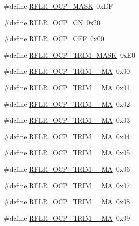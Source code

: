 \begin{DoxyCompactItemize}
\item 
\#define \mbox{\hyperlink{sx1276_regs-_lo_ra_8h_a811d1ea4838fb5bdbc731e246f9abd00}{R\+F\+L\+R\+\_\+\+O\+C\+P\+\_\+\+M\+A\+SK}}~0x\+DF
\item 
\#define \mbox{\hyperlink{sx1276_regs-_lo_ra_8h_ab4cd8bafefd94bf96c0eda92a1a0e2cc}{R\+F\+L\+R\+\_\+\+O\+C\+P\+\_\+\+ON}}~0x20
\item 
\#define \mbox{\hyperlink{sx1276_regs-_lo_ra_8h_add262ca41df12a73f7ab0fe05ca26253}{R\+F\+L\+R\+\_\+\+O\+C\+P\+\_\+\+O\+FF}}~0x00
\item 
\#define \mbox{\hyperlink{sx1276_regs-_lo_ra_8h_a218c5b62787ba2141067b6273f2e43a3}{R\+F\+L\+R\+\_\+\+O\+C\+P\+\_\+\+T\+R\+I\+M\+\_\+\+M\+A\+SK}}~0x\+E0
\item 
\#define \mbox{\hyperlink{sx1276_regs-_lo_ra_8h_a6656289f06f654d070ee51d72830d1cb}{R\+F\+L\+R\+\_\+\+O\+C\+P\+\_\+\+T\+R\+I\+M\+\_\+\_\+\+MA}}~0x00
\item 
\#define \mbox{\hyperlink{sx1276_regs-_lo_ra_8h_a102d3235b329da485a39882b6f06fec4}{R\+F\+L\+R\+\_\+\+O\+C\+P\+\_\+\+T\+R\+I\+M\+\_\+\_\+\+MA}}~0x01
\item 
\#define \mbox{\hyperlink{sx1276_regs-_lo_ra_8h_a916a524ad394506a119ea2c5d8d2642c}{R\+F\+L\+R\+\_\+\+O\+C\+P\+\_\+\+T\+R\+I\+M\+\_\+\_\+\+MA}}~0x02
\item 
\#define \mbox{\hyperlink{sx1276_regs-_lo_ra_8h_a7fc3cb1a990f3c479cf620772593991b}{R\+F\+L\+R\+\_\+\+O\+C\+P\+\_\+\+T\+R\+I\+M\+\_\+\_\+\+MA}}~0x03
\item 
\#define \mbox{\hyperlink{sx1276_regs-_lo_ra_8h_a1d7e9642b9adfb481f9696186a068db8}{R\+F\+L\+R\+\_\+\+O\+C\+P\+\_\+\+T\+R\+I\+M\+\_\+\_\+\+MA}}~0x04
\item 
\#define \mbox{\hyperlink{sx1276_regs-_lo_ra_8h_a08ffd9de8d0ea7320df82bf3ddd38430}{R\+F\+L\+R\+\_\+\+O\+C\+P\+\_\+\+T\+R\+I\+M\+\_\+\_\+\+MA}}~0x05
\item 
\#define \mbox{\hyperlink{sx1276_regs-_lo_ra_8h_add96158d00533ceefc7b0ab356e4a6cc}{R\+F\+L\+R\+\_\+\+O\+C\+P\+\_\+\+T\+R\+I\+M\+\_\+\_\+\+MA}}~0x06
\item 
\#define \mbox{\hyperlink{sx1276_regs-_lo_ra_8h_a2551f7eacef1961881b7b38c724b393b}{R\+F\+L\+R\+\_\+\+O\+C\+P\+\_\+\+T\+R\+I\+M\+\_\+\_\+\+MA}}~0x07
\item 
\#define \mbox{\hyperlink{sx1276_regs-_lo_ra_8h_a944d696fcf109d939378d53b4f85f9fb}{R\+F\+L\+R\+\_\+\+O\+C\+P\+\_\+\+T\+R\+I\+M\+\_\+\_\+\+MA}}~0x08
\item 
\#define \mbox{\hyperlink{sx1276_regs-_lo_ra_8h_a4928b1121ada662258df2b1741f8f6ea}{R\+F\+L\+R\+\_\+\+O\+C\+P\+\_\+\+T\+R\+I\+M\+\_\+\_\+\+MA}}~0x09

\end{DoxyCompactItemize}
